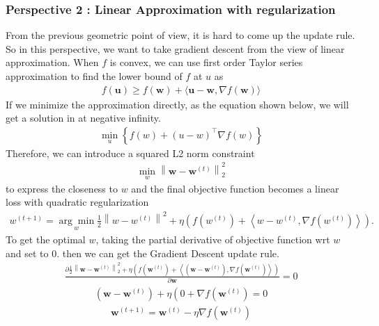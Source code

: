 \documentclass[11pt]{article}
\begin{document}
\subsubsection{Perspective 2 : Linear Approximation with regularization}
From the previous geometric point of view, it is hard to come up the update rule. So in this perspective, we want to take gradient descent from the view of linear approximation. When $f$ is convex, we can use first order Taylor series approximation to find the lower bound of $f$ at $u$ as
\begin{align}
f(\boldsymbol{u}) \geq f(\boldsymbol{w})+\langle\boldsymbol{u}-\boldsymbol{w}, \nabla f(\boldsymbol{w})\rangle
\end{align}
If we minimize the approximation directly, as the equation shown below, we will get a solution in at negative infinity. 
\begin{align}
\min_{u}\left\{f(w)+(u-w)^{\top} \nabla f(w)\right\}
\end{align}
Therefore, we can introduce a squared L2 norm constraint 
\begin{align}
    \min _{w}\left\|\boldsymbol{w}-\boldsymbol{w}^{(t)}\right\|_{2}^{2}
\end{align}to express the closeness to $w$ and the final objective function becomes a linear loss with quadratic regularization
\begin{align}
    w^{(t+1)}=\underset{w}{\arg \min } \frac{1}{2}\left\|w-w^{(t)}\right\|^{2}+\eta\left(f\left(w^{(t)}\right)+\left\langle w-w^{(t)}, \nabla f\left(w^{(t)}\right) \right\rangle \right).
\end{align}
To get the optimal $w$, taking the partial derivative of objective function wrt $w$ and set to 0. then we can get the Gradient Descent update rule.  
\begin{align}
\frac{\partial \frac{1}{2}\left\|\mathbf{w}-\mathbf{w}^{(t)}\right\|_{2}^{2}+\eta\left(f\left(\mathbf{w}^{(t)}\right)+\left\langle\left(\mathbf{w}-\mathbf{w}^{(t)}\right), \nabla f\left(\mathbf{w}^{(t)}\right)\right\rangle\right)}{\partial \mathbf{w}}=0 
\end{align}
\begin{align}
\left(\mathbf{w}-\mathbf{w}^{(t)}\right)+\eta\left(0+\nabla f\left(\mathbf{w}^{(t)}\right)=0\right.
\end{align}
\begin{align}
\mathbf{w}^{(t+1)}=\mathbf{w}^{(t)}-\eta \nabla f\left(\mathbf{w}^{(t)}\right)
\end{align}
\end{document}
